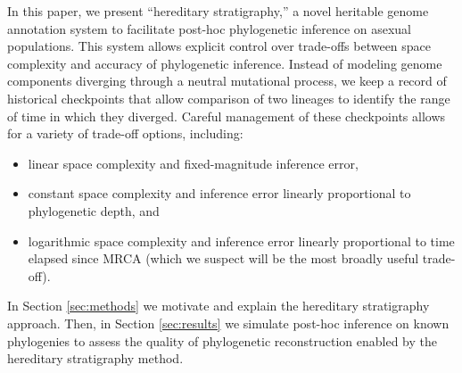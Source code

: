 In this paper, we present ``hereditary stratigraphy,'' a novel heritable genome annotation system to facilitate post-hoc phylogenetic inference on asexual populations.
This system allows explicit control over trade-offs between space complexity and accuracy of phylogenetic inference.
Instead of modeling genome components diverging through a neutral mutational process, we keep a record of historical checkpoints that allow comparison of two lineages to identify the range of time in which they diverged.
Careful management of these checkpoints allows for a variety of trade-off options, including:
\begin{itemize}
  \item linear space complexity and fixed-magnitude inference error,
  \item constant space complexity and inference error linearly proportional to phylogenetic depth, and
  \item logarithmic space complexity and inference error linearly proportional to time elapsed since MRCA (which we suspect will be the most broadly useful trade-off).
\end{itemize}

In Section \ref{sec:methods} we motivate and explain the hereditary stratigraphy approach.
Then, in Section \ref{sec:results} we simulate post-hoc inference on known phylogenies to assess the quality of phylogenetic reconstruction enabled by the hereditary stratigraphy method.
